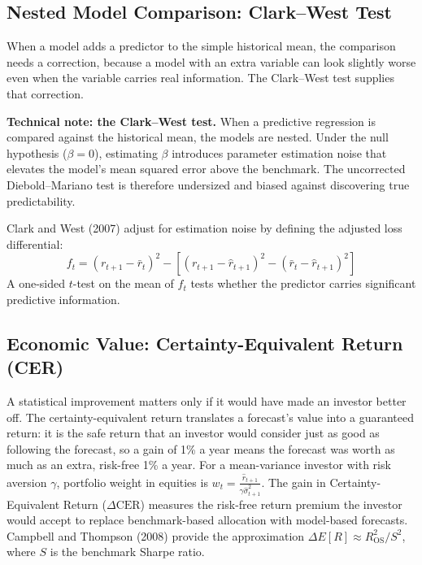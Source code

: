 \subsection{Nested Model Comparison: Clark--West Test}
When a model adds a predictor to the simple historical mean, the comparison needs a correction, because a model with an extra variable can look slightly worse even when the variable carries real information. The Clark--West test supplies that correction.

\begin{technote}
\textbf{Technical note: the Clark--West test.} When a predictive regression is compared against the historical mean, the models are nested. Under the null hypothesis ($\beta=0$), estimating $\beta$ introduces parameter estimation noise that elevates the model's mean squared error above the benchmark. The uncorrected Diebold--Mariano test is therefore undersized and biased against discovering true predictability.

Clark and West (2007) adjust for estimation noise by defining the adjusted loss differential:
\begin{equation}
  f_t = (r_{t+1} - \bar r_t)^2 - \left[(r_{t+1} - \hat r_{t+1})^2 - (\bar r_t - \hat r_{t+1})^2\right]
  \label{eq:09-cw}
\end{equation}
A one-sided $t$-test on the mean of $f_t$ tests whether the predictor carries significant predictive information.
\end{technote}

\subsection{Economic Value: Certainty-Equivalent Return (CER)}
A statistical improvement matters only if it would have made an investor better off. The certainty-equivalent return translates a forecast's value into a guaranteed return: it is the safe return that an investor would consider just as good as following the forecast, so a gain of 1\% a year means the forecast was worth as much as an extra, risk-free 1\% a year. For a mean-variance investor with risk aversion $\gamma$, portfolio weight in equities is $w_t = \frac{\hat{r}_{t+1}}{\gamma \hat{\sigma}^2_{t+1}}$. The gain in Certainty-Equivalent Return ($\Delta \text{CER}$) measures the risk-free return premium the investor would accept to replace benchmark-based allocation with model-based forecasts. Campbell and Thompson (2008) provide the approximation $\Delta E[R] \approx R^2_{\text{OS}} / S^2$, where $S$ is the benchmark Sharpe ratio.

